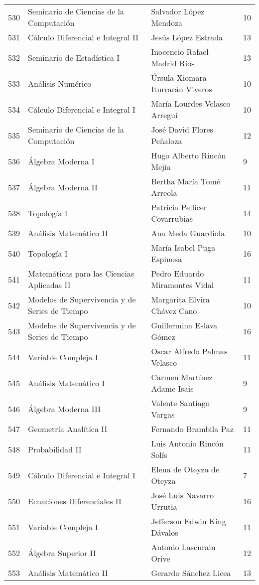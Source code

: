\begin{table}[ht]
\begin{tabular}{rlll}
  530 & Seminario de Ciencias de la Computación & Salvador López Mendoza & 10 \\ 
  531 & Cálculo Diferencial e Integral II & Jesús López Estrada & 13 \\ 
  532 & Seminario de Estadística I & Inocencio Rafael Madrid Ríos & 13 \\ 
  533 & Análisis Numérico & Úrsula Xiomara Iturrarán Viveros & 10 \\ 
  534 & Cálculo Diferencial e Integral I & María Lourdes Velasco Arreguí & 10 \\ 
  535 & Seminario de Ciencias de la Computación & José David Flores Peñaloza & 12 \\ 
  536 & Álgebra Moderna I & Hugo Alberto Rincón Mejía & 9 \\ 
  537 & Álgebra Moderna II & Bertha María Tomé Arreola & 11 \\ 
  538 & Topología I & Patricia Pellicer Covarrubias & 14 \\ 
  539 & Análisis Matemático II & Ana Meda Guardiola & 10 \\ 
  540 & Topología I & María Isabel Puga Espinosa & 16 \\ 
  541 & Matemáticas para las Ciencias Aplicadas II & Pedro Eduardo Miramontes Vidal & 11 \\ 
  542 & Modelos de Supervivencia y de Series de Tiempo & Margarita Elvira Chávez Cano & 10 \\ 
  543 & Modelos de Supervivencia y de Series de Tiempo & Guillermina Eslava Gómez & 16 \\ 
  544 & Variable Compleja I & Oscar Alfredo Palmas Velasco & 11 \\ 
  545 & Análisis Matemático I & Carmen Martínez Adame Isais & 9 \\ 
  546 & Álgebra Moderna III & Valente Santiago Vargas & 9 \\ 
  547 & Geometría Analítica II & Fernando Brambila Paz & 11 \\ 
  548 & Probabilidad II & Luis Antonio Rincón Solís & 11 \\ 
  549 & Cálculo Diferencial e Integral I & Elena de Oteyza de Oteyza & 7 \\ 
  550 & Ecuaciones Diferenciales II & José Luis Navarro Urrutia & 16 \\ 
  551 & Variable Compleja I & Jefferson Edwin King Dávalos & 11 \\ 
  552 & Álgebra Superior II & Antonio Lascurain Orive & 12 \\ 
  553 & Análisis Matemático II & Gerardo Sánchez Licea & 13 \\ 

\end{tabular}
\end{table}
